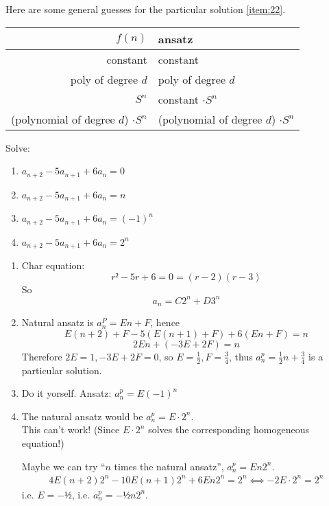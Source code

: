 \documentclass[english]{lbscript}
\begin{document}
Here are some general guesses for the particular solution \ref{item:22}.\\
\begin{tabular}{rl}
\toprule
  \(f(n)\) & ansatz \\
  \midrule
  constant & constant \\
  poly of degree \(d\) & poly of degree \(d\) \\
  \(S^{n}\) & constant \(⋅ S^{n}\)\\
  (polynomial of degree \(d\)) \(⋅ S^{n}\) & (polynomial of degree \(d\)) \(⋅ S^{n}\) \\
  \bottomrule
\end{tabular}

\begin{example}{}{}
  Solve:
\begin{enumerate}[label=\alph{*})]
\item\label{item:25} \(a_{n+2}-5 a_{n+1} + 6 a_n = 0\)
\item\label{item:26} \(a_{n+2}-5 a_{n+1} + 6 a_n = n\)
\item\label{item:28} \(a_{n+2}-5 a_{n+1} + 6 a_n = (-1)^{n}\)
\item\label{item:29} \(a_{n+2}-5 a_{n+1} + 6 a_n = 2^{n}\)
\end{enumerate}
\tcblower
\begin{enumerate}[label=Sol. \alph{*})]
\item Char equation:
\begin{equation}
\label{eq:83}
r² - 5r + 6 = 0 = (r-2)(r-3)
\end{equation}
So
\begin{equation}
\label{eq:84}
a_n=C 2^{n} + D 3^{n}
\end{equation}
\item Natural ansatz is \(a_{n}^{P}= En +F\), hence
\begin{equation}
\label{eq:85}
E(n+2)+F - 5 (E(n+1)+F)+6(En+F)  = n
\end{equation}
\begin{equation}
\label{eq:86}
2En + (-3E +2F) = n
\end{equation}
Therefore \(2E=1, -3E+2F=0\), so \(E= \frac{1}{2}, F= \frac{3}{4}\), thus \(a_{n}^{p}= \frac{1}{2}n + \frac{3}{4}\) is a particular solution.
\item\label{item:30} Do it yorself. Ansatz: \(a^{p}_{n}= E (-1)^{n}\)
\item\label{item:31} The natural ansatz would be \(a_n^{p}=E⋅2^{n}\).\\
  This can't work! (Since \(E⋅2^{n}\) solves the corresponding homogeneous equation!)

  Maybe we can try \enquote{\(n\) times the natural ansatz}, \(a_n^{p}=En2^{n}\).
\begin{align}
\label{eq:87}
4E(n+2)2^{n} - 10E(n+1)2^{n} + 6 E n 2^{n} = 2^{n} ⟺ -2E⋅2^{n} = 2^{n}
\end{align}
i.e. \(E=-½\), i.e. \(a_n^{p}=-½n 2^{n}\).
\end{enumerate}
\end{example}
\end{document}
